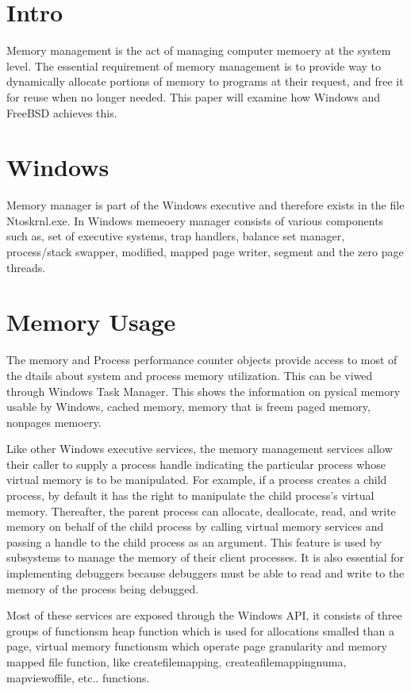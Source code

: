 \documentclass[letterpaper,10pt,draftclsnofoot,onecolumn]{IEEEtran}
\begin{document}
\section*{Intro}

Memory management is the act of managing computer memoery at the system level. The essential requirement of memory management is to provide way to dynamically allocate portions of memory to programs at their request, and free it for reuse when no longer needed. This paper will examine how Windows and FreeBSD achieves this. 

\section*{Windows}

Memory manager is part of the Windows executive and therefore exists in the file Ntoskrnl.exe. In Windows memeoery manager consists of various components such as, set of executive systems, trap handlers, balance set manager, process/stack swapper, modified, mapped page writer,
segment and the zero page threads.\cite{[1]}

\section*{Memory Usage}

The memory and Process performance counter objects provide access to most of the dtails about system and process memory utilization. This can be viwed through Windows Task Manager. This shows the information on pysical memory usable by Windows, cached memory, memory that is freem paged memory, nonpages memoery.

Like other Windows executive services, the memory management services allow their caller to
supply a process handle indicating the particular process whose virtual memory is to be manipulated. For example, if a process creates a child process, by default it has the right to manipulate the child process’s virtual memory. Thereafter, the parent process can allocate, deallocate, read, and write memory on behalf of the child process by calling virtual memory services and passing a handle to the child process as an argument. This feature is used by subsystems to manage the memory of their client processes. It is also essential for implementing debuggers because debuggers must be able to read and write to the memory of the process being debugged.

Most of these services are exposed through the Windows API, it consists of three groups of functionsm heap function which is used for allocations smalled than a page, virtual memory functionsm which operate page granularity and memory mapped file function, like createfilemapping, createafilemappingnuma, mapviewoffile, etc.. functions.
\end{document}
